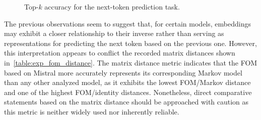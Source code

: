 \begin{figure}[tp!]
    \centering
    \begingroup
    \captionsetup{width=0.9\textwidth/2}
    \quad
    \quad
    \endgroup
    \caption{Top-$k$ accuracy for the next-token prediction task.}
    \label{fig:exp_fom_1_A}
\end{figure}

The previous observations seem to suggest that, for certain models, embeddings may exhibit a closer relationship to their inverse rather than serving as representations for predicting the next token based on the previous one.
However, this interpretation appears to conflict the recorded matrix distances shown in~\cref{table:exp_fom_distance}.
The matrix distance metric indicates that the FOM based on Mistral more accurately represents its corresponding Markov model than any other analyzed model, as it exhibits the lowest FOM/Markov distance and one of the highest FOM/identity distances.
Nonetheless, direct comparative statements based on the matrix distance should be approached with caution as this metric is neither widely used nor inherently reliable.

